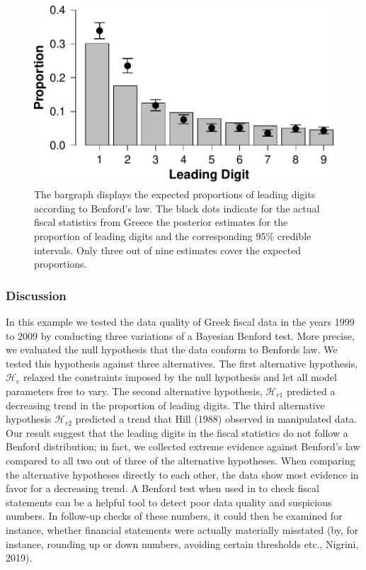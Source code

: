 \documentclass[
  english,
  man,floatsintext]{apa6}
\begin{document}
\begin{figure}
\centering
\includegraphics{Rpackage_paper_files/figure-latex/benford-1.pdf}
\caption{\label{fig:benford}The bargraph displays the expected proportions of leading digits according to Benford's law. The black dots indicate for the actual fiscal statistics from Greece the posterior estimates for the proportion of leading digits and the corresponding 95\% credible intervals. Only three out of nine estimates cover the expected proportions.}
\end{figure}

\hypertarget{discussion}{%
\subsubsection{Discussion}\label{discussion}}

In this example we tested the data quality of Greek fiscal data in the years 1999 to 2009 by conducting three variations of a Bayesian Benford test. More precise, we evaluated the null hypothesis that the data conform to Benfords law. We tested this hypothesis against three alternatives. The first alternative hypothesis, \(\mathcal{H}_e\) relaxed the constraints imposed by the null hypothesis and let all model parameters free to vary. The second alternative hypothesis, \(\mathcal{H}_{r1}\) predicted a decreasing trend in the proportion of leading digits. The third alternative hypothesis \(\mathcal{H}_{r2}\) predicted a trend that Hill (1988) observed in manipulated data. Our result suggest that the leading digits in the fiscal statistics do not follow a Benford distribution; in fact, we collected extreme evidence against Benford's law compared to all two out of three of the alternative hypotheses. When comparing the alternative hypotheses directly to each other, the data show most evidence in favor for a decreasing trend. A Benford test when used in to check fiscal statements can be a helpful tool to detect poor data quality and suspicious numbers. In follow-up checks of these numbers, it could then be examined for instance, whether financial statements were actually materially misstated (by, for instance, rounding up or down numbers, avoiding certain thresholds etc., Nigrini, 2019).
\end{document}
